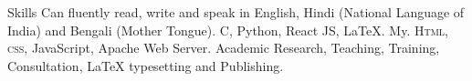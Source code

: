 \begin{rubric}{Skills}
	\entry*[Languages]
		Can fluently read, write and speak in English, Hindi (National Language of India) and Bengali (Mother Tongue).
		C, Python, React JS, LaTeX.
	\entry*[Databases]
		My.
		\textsc{Html, css}, JavaScript, Apache Web Server.
	\entry*[Misc.]
		Academic Research, Teaching, Training, Consultation, LaTeX typesetting and Publishing.
	\end{rubric}
	